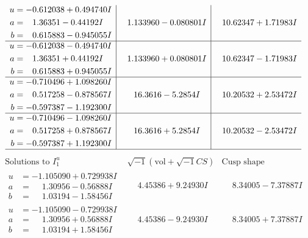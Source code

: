 \documentclass[1p]{elsarticle_modified}
\theoremstyle{definition}
\newcommand{\I}{\sqrt{-1}}
\begin{document}
$$\begin{array}{c|c|c}
\begin{aligned}
u &= -0.612038 + 0.494740 I \\
a &= \phantom{-}1.36351 - 0.44192 I \\
b &= \phantom{-}0.615883 - 0.945055 I\end{aligned}
 & \phantom{-}1.133960 - 0.080801 I & \phantom{-}10.62347 + 1.71983 I \\ \hline\begin{aligned}
u &= -0.612038 - 0.494740 I \\
a &= \phantom{-}1.36351 + 0.44192 I \\
b &= \phantom{-}0.615883 + 0.945055 I\end{aligned}
 & \phantom{-}1.133960 + 0.080801 I & \phantom{-}10.62347 - 1.71983 I \\ \hline\begin{aligned}
u &= -0.710496 + 1.098260 I \\
a &= \phantom{-}0.517258 - 0.878567 I \\
b &= -0.597387 - 1.192300 I\end{aligned}
 & \phantom{-}16.3616 - 5.2854 I & \phantom{-}10.20532 + 2.53472 I \\ \hline\begin{aligned}
u &= -0.710496 - 1.098260 I \\
a &= \phantom{-}0.517258 + 0.878567 I \\
b &= -0.597387 + 1.192300 I\end{aligned}
 & \phantom{-}16.3616 + 5.2854 I & \phantom{-}10.20532 - 2.53472 I\\
 \hline 
 \end{array}$$\newpage$$\begin{array}{c|c|c}  
\text{Solutions to }I^u_{1}& \I (\text{vol} + \sqrt{-1}CS) & \text{Cusp shape}\\
 \hline 
\begin{aligned}
u &= -1.105090 + 0.729938 I \\
a &= \phantom{-}1.30956 - 0.56888 I \\
b &= \phantom{-}1.03194 - 1.58456 I\end{aligned}
 & \phantom{-}4.45386 + 9.24930 I & \phantom{-}8.34005 - 7.37887 I \\ \hline\begin{aligned}
u &= -1.105090 - 0.729938 I \\
a &= \phantom{-}1.30956 + 0.56888 I \\
b &= \phantom{-}1.03194 + 1.58456 I\end{aligned}
 & \phantom{-}4.45386 - 9.24930 I & \phantom{-}8.34005 + 7.37887 I \\ \hline\begin{aligned}

\end{aligned}
\end{array}$$
\end{document}
